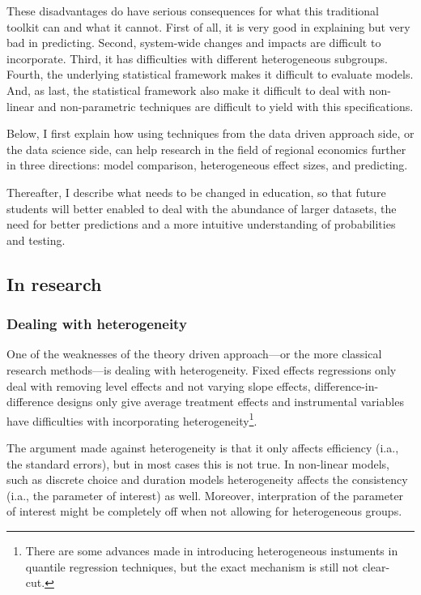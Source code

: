 \documentclass[fleqn,10pt]{SelfArx} %
\begin{document}
These disadvantages do have serious consequences for what this traditional
toolkit can and what it cannot. First of all, it is very
good in explaining but very bad in predicting. Second, system-wide changes and
impacts are difficult to incorporate. Third, it has difficulties with different
heterogeneous subgroups. Fourth, the underlying statistical framework makes it
difficult to evaluate models. And, as last, the statistical framework also make
it difficult to deal with non-linear and non-parametric techniques are
difficult to yield with this specifications.

Below, I first explain how using techniques from the data driven approach side, or the
data science side, can help research in  the field of regional economics further in three
directions: model comparison, heterogeneous effect sizes, and predicting.

Thereafter, I describe what needs to be changed in education, so that future
students will better enabled to deal with the abundance of larger datasets, the
need for better predictions and a more intuitive understanding of probabilities
and testing.

\subsection{In research}

\subsubsection{Dealing with heterogeneity}

One of the weaknesses of the theory driven approach---or the more classical
research methods---is dealing with heterogeneity. Fixed effects regressions
only deal with removing level effects and not varying slope effects,
difference-in-difference designs only give average treatment effects and
instrumental variables have difficulties with incorporating
heterogeneity\footnote{There are some advances made in introducing
  heterogeneous instuments in quantile regression techniques, but the exact
  mechanism is still not clear-cut.}.

The argument made against heterogeneity is that it only affects efficiency
(i.a., the standard errors), but in most cases this is not true. In non-linear
models, such as discrete choice and duration models heterogeneity affects the
consistency (i.a., the parameter of interest) as well. Moreover, interpration of
the parameter of interest might be completely off when not allowing for
heterogeneous groups. 
\end{document}
